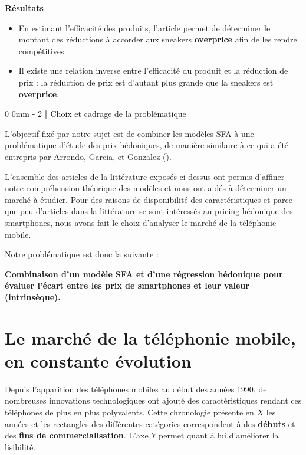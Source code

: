 \documentclass[
  12pt,
]{report}
\makeatletter
\renewcommand{\chapter}{%
    \clearpage %
    \@startsection{chapter}%
    {0} %
    {0mm} %
    {-\baselineskip} %
    {2\baselineskip} %
    {\normalfont\Huge\bfseries | \Huge\bfseries}%
}
\makeatother
\begin{document}
\textbf{Résultats}

\begin{itemize}
\item
  En estimant l'efficacité des produits, l'article permet de déterminer
  le montant des réductions à accorder aux sneakers \textbf{overprice}
  afin de les rendre compétitives.
\item
  Il existe une relation inverse entre l'efficacité du produit et la
  réduction de prix : la réduction de prix est d'autant plus grande que
  la sneakers est \textbf{overprice}.
\end{itemize}

\chapter{Choix et cadrage de la
problématique}\label{choix-et-cadrage-de-la-probluxe9matique}

L'objectif fixé par notre sujet est de combiner les modèles SFA à une
problématique d'étude des prix hédoniques, de manière similaire à ce qui
a été entrepris par Arrondo, Garcia, et Gonzalez
().

L'ensemble des articles de la littérature exposés ci-dessus ont permis
d'affiner notre compréhension théorique des modèles et nous ont aidés à
déterminer un marché à étudier. Pour des raisons de disponibilité des
caractéristiques et parce que peu d'articles dans la littérature se sont
intéressés au pricing hédonique des smartphones, nous avons fait le
choix d'analyser le marché de la téléphonie mobile.

Notre problématique est donc la suivante :

\textbf{Combinaison d'un modèle SFA et d'une régression hédonique pour
évaluer l'écart entre les prix de smartphones et leur valeur
(intrinsèque).}

\section{Le marché de la téléphonie mobile, en constante
évolution}\label{le-marchuxe9-de-la-tuxe9luxe9phonie-mobile-en-constante-uxe9volution}

Depuis l'apparition des téléphones mobiles au début des années 1990, de
nombreuses innovations technologiques ont ajouté des caractéristiques
rendant ces téléphones de plus en plus polyvalents. Cette chronologie
présente en \(X\) les années et les rectangles des différentes
catégories correspondent à des \textbf{débuts} et des \textbf{fins de
commercialisation}. L'axe \(Y\) permet quant à lui d'améliorer la
lisibilité.
\end{document}
